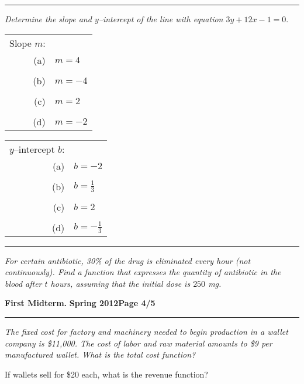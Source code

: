 \documentclass[12pt]{article}
\begin{document}
\vspace{2cm}
\hrule
{\problem[10 pts] \em Determine the slope and $y$--intercept of the
  line with equation $3y+12x-1=0.$}
\begin{tabular}{rl}
Slope $m$: \\
(a) & $m=4$ \\ \\
(b) & $m=-4$ \\ \\
(c) &$m=2$ \\ \\
(d) &$m=-2$
\end{tabular} \hspace{3cm}
\begin{tabular}{rl}
$y$--intercept $b$: \\
(a) & $b=-2$ \\ \\
(b) &$b=\tfrac{1}{3}$ \\ \\
(c) &$b=2$ \\ \\
(d) &$b=-\tfrac{1}{3}$
\end{tabular}
\vspace{3.5cm}
\hrule
{\problem[10 pts] \em For certain antibiotic, 30\% of the drug is
  eliminated every hour (not continuously).  Find a function that expresses the
quantity of antibiotic in the blood after $t$ hours, assuming that the initial
dose is $250$ mg.}
\vspace{3.5cm}
\begin{flushright}
\end{flushright}
\newpage

\hfill{\large\bf First Midterm.}\hfill{\large\bf
  Spring 2012}\hfill{\large\bf Page 4/5}\hrule

\bigskip
{\problem[25 pts] \em The fixed cost for factory and machinery needed
  to begin production in a wallet company is \$11,000.  The cost of
  labor and raw material amounts to \$9 per manufactured wallet.
  What is the total cost function?}
\vspace{1cm}

\begin{flushright}
\end{flushright}
\noindent
If wallets sell for \$20 each, what is the revenue function?
\vspace{1cm}
\end{document}
